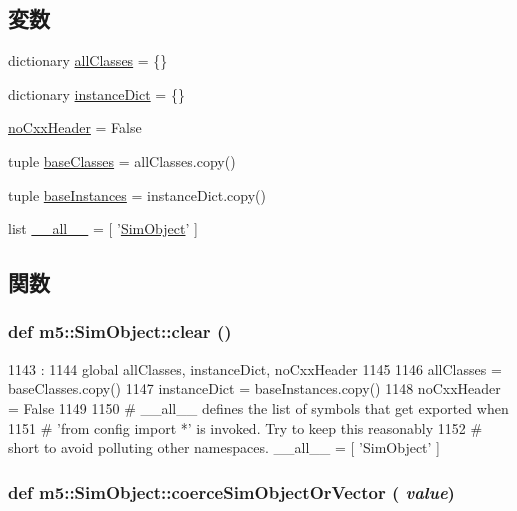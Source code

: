 \subsection*{変数}
\begin{DoxyCompactItemize}
\item 
dictionary \hyperlink{namespacem5_1_1SimObject_a47bdc1dd02e989cd5c98785b7e37af55}{allClasses} = \{\}
\item 
dictionary \hyperlink{namespacem5_1_1SimObject_a05db33215202fbb08d002ba01ff26d78}{instanceDict} = \{\}
\item 
\hyperlink{namespacem5_1_1SimObject_acf7837fcf62a4ea73e02936f3f57203e}{noCxxHeader} = False
\item 
tuple \hyperlink{namespacem5_1_1SimObject_aa25ce1667a6faf943271207f2cbfe0a9}{baseClasses} = allClasses.copy()
\item 
tuple \hyperlink{namespacem5_1_1SimObject_a6c61232b42336e2874255341e828a11f}{baseInstances} = instanceDict.copy()
\item 
list \hyperlink{namespacem5_1_1SimObject_aa4a022e6ddacd362b83964da5cc5d044}{\_\-\_\-all\_\-\_\-} = \mbox{[} '\hyperlink{classm5_1_1SimObject_1_1SimObject}{SimObject}' \mbox{]}
\end{DoxyCompactItemize}


\subsection{関数}
\hypertarget{namespacem5_1_1SimObject_a99a986be27e605f2494721c4c56d8cbb}{
\subsubsection[{clear}]{\setlength{\rightskip}{0pt plus 5cm}def m5::SimObject::clear ()}}
\label{namespacem5_1_1SimObject_a99a986be27e605f2494721c4c56d8cbb}



\begin{DoxyCode}
1143            :
1144     global allClasses, instanceDict, noCxxHeader
1145 
1146     allClasses = baseClasses.copy()
1147     instanceDict = baseInstances.copy()
1148     noCxxHeader = False
1149 
1150 # __all__ defines the list of symbols that get exported when
1151 # 'from config import *' is invoked.  Try to keep this reasonably
1152 # short to avoid polluting other namespaces.
__all__ = [ 'SimObject' ]
\end{DoxyCode}
\hypertarget{namespacem5_1_1SimObject_ae5dd83a9b8164c3297ab06fa15f361e9}{
\subsubsection[{coerceSimObjectOrVector}]{\setlength{\rightskip}{0pt plus 5cm}def m5::SimObject::coerceSimObjectOrVector ( {\em value})}}
\label{namespacem5_1_1SimObject_ae5dd83a9b8164c3297ab06fa15f361e9}



